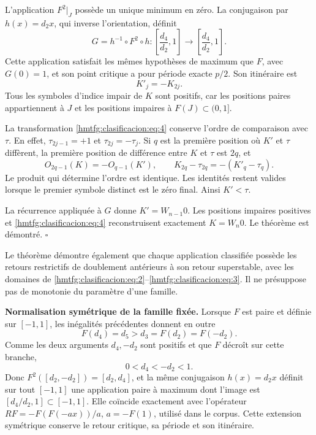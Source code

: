 L’application \(F^2|_J\) possède un unique minimum en zéro. La conjugaison par \(h(x)=d_2x\), qui inverse l’orientation, définit
\begin{equation}
G=h^{-1}\circ F^2\circ h:
\left[\frac{d_4}{d_2},1\right]\longrightarrow
\left[\frac{d_4}{d_2},1\right].
\label{hmtfg:clasificacion:eq:3}
\end{equation}
Cette application satisfait les mêmes hypothèses de maximum que \(F\), avec \(G(0)=1\), et son point critique a pour période exacte \(p/2\). Son itinéraire est
\begin{equation}
K'_j=-K_{2j}.
\label{hmtfg:clasificacion:eq:4}
\end{equation}
Tous les symboles d’indice impair de \(K\) sont positifs, car les positions paires appartiennent à \(J\) et les positions impaires à \(F(J)\subset(0,1]\).

La transformation \eqref{hmtfg:clasificacion:eq:4} conserve l’ordre de comparaison avec \(\tau\). En effet, \(\tau_{2j-1}=+1\) et \(\tau_{2j}=-\tau_j\). Si \(q\) est la première position où \(K'\) et \(\tau\) diffèrent, la première position de différence entre \(K\) et \(\tau\) est \(2q\), et
\begin{equation}
O_{2q-1}(K)=-O_{q-1}(K'),
\qquad K_{2q}-\tau_{2q}=-(K'_q-\tau_q).
\label{hmtfg:clasificacion:eq:5}
\end{equation}
Le produit qui détermine l’ordre est identique. Les identités restent valides lorsque le premier symbole distinct est le zéro final. Ainsi \(K'<\tau\).

La récurrence appliquée à \(G\) donne \(K'=W_{n-1}0\). Les positions impaires positives et \eqref{hmtfg:clasificacion:eq:4} reconstruisent exactement \(K=W_n0\). Le théorème est démontré. \(\square\)

Le théorème démontre également que chaque application classifiée possède les retours restrictifs de doublement antérieurs à son retour superstable, avec les domaines de \eqref{hmtfg:clasificacion:eq:2}–\eqref{hmtfg:clasificacion:eq:3}. Il ne présuppose pas de monotonie du paramètre d’une famille.

\textbf{Normalisation symétrique de la famille fixée.} Lorsque \(F\) est paire et définie sur \([-1,1]\), les inégalités précédentes donnent en outre
\[
F(d_4)=d_5>d_3=F(d_2)=F(-d_2).
\]
Comme les deux arguments \(d_4,-d_2\) sont positifs et que \(F\) décroît sur cette branche,
\begin{equation}
0<d_4<-d_2<1.
\label{hmtfg:clasificacion:eq:5a}
\end{equation}
Donc \(F^2([d_2,-d_2])=[d_2,d_4]\), et la même conjugaison \(h(x)=d_2x\) définit sur tout \([-1,1]\) une application paire à maximum dont l’image est \([d_4/d_2,1]\subset[-1,1]\). Elle coïncide exactement avec l’opérateur \(RF=-F(F(-ax))/a\), \(a=-F(1)\), utilisé dans le corpus. Cette extension symétrique conserve le retour critique, sa période et son itinéraire.


